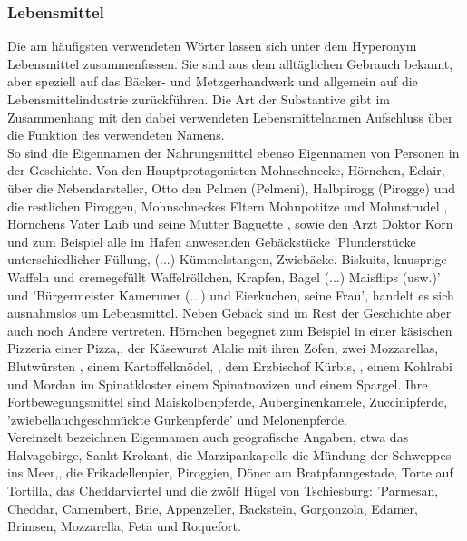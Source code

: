 \subsubsection{Lebensmittel}

Die am häufigsten verwendeten Wörter lassen sich unter dem Hyperonym Lebensmittel zusammenfassen. Sie sind aus dem alltäglichen Gebrauch bekannt, aber speziell auf das Bäcker- und Metzgerhandwerk und allgemein auf die Lebensmittelindustrie zurückführen. Die Art der Substantive gibt im Zusammenhang mit den dabei verwendeten Lebensmittelnamen Aufschluss über die Funktion des verwendeten Namens. 
\\
So sind die Eigennamen der Nahrungsmittel ebenso Eigennamen von Personen in der Geschichte. Von den Hauptprotagonisten Mohnschnecke,\cite[S.13ff]{pir} Hörnchen,\cite[S.25ff]{pir} Eclair,\cite[S.15ff]{pir} über die Nebendarsteller, Otto den Pelmen (Pelmeni),\cite[S.45ff]{pir} Halbpirogg (Pirogge) und die restlichen Piroggen,\cite[S.33ff]{pir} Mohnschneckes Eltern Mohnpotitze \cite[S.13]{pir} und Mohnstrudel \cite[S.13]{pir}, Hörnchens Vater Laib \cite[S.40]{pir} und seine Mutter Baguette \cite[S.63]{pir}, sowie den Arzt Doktor Korn \cite[S.39]{pir} und zum Beispiel alle im Hafen anwesenden Gebäckstücke 'Plunderstücke unterschiedlicher Füllung, (...) Kümmelstangen, Zwiebäcke. Biskuits, knusprige Waffeln und cremegefüllt Waffelröllchen, Krapfen, Bagel (...) Maisflips (usw.)'\cite[S.38]{pir} und 'Bürgermeister Kameruner (...) und Eierkuchen, seine Frau',\cite[S.189]{pir} handelt es sich ausnahmslos um Lebensmittel. Neben Gebäck sind im Rest der Geschichte aber auch noch Andere vertreten. Hörnchen begegnet zum Beispiel in einer käsischen Pizzeria einer Pizza,\cite[S.171]{pir}, der Käsewurst Alalie mit ihren Zofen, zwei Mozzarellas,\cite[S.179]{pir} Blutwürsten \cite[S.220ff]{pir}, einem Kartoffelknödel, \cite[S.223]{pir}, dem Erzbischof Kürbis, \cite[S.289]{pir}, einem Kohlrabi \cite[S.289]{pir} und Mordan im Spinatkloster einem Spinatnovizen \cite[S.400f]{pir} und einem Spargel.\cite[S.401]{pir} Ihre Fortbewegungsmittel sind Maiskolbenpferde, \cite[S.124]{pir}\cite[S.241]{pir} Auberginenkamele,\cite[S.126]{pir} Zuccinipferde, \cite[S.286]{pir} 'zwiebellauchgeschmückte Gurkenpferde' \cite[S.289]{pir} und Melonenpferde.\cite[S.291]{pir}
\\
Vereinzelt bezeichnen Eigennamen auch geografische Angaben, etwa das Halvagebirge,\cite[S.165]{pir} Sankt Krokant,\cite[S.19ff]{pir} die Marzipankapelle \cite[S.18]{pir} die Mündung der Schweppes ins Meer,\cite[S.187]{pir}, die Frikadellenpier,\cite[S.21]{pir} Piroggien,\cite[S.479ff]{pir} Döner am Bratpfanngestade, \cite[S.381]{pir} Torte auf Tortilla,\cite[S.405]{pir} das Cheddarviertel \cite[S.169]{pir} und die zwölf Hügel von Tschiesburg: \cite[S.165]{pir} 'Parmesan, Cheddar, Camembert, Brie, Appenzeller, Backstein, Gorgonzola, Edamer, Brimsen, Mozzarella, Feta und Roquefort.\cite[S.165]{pir}
